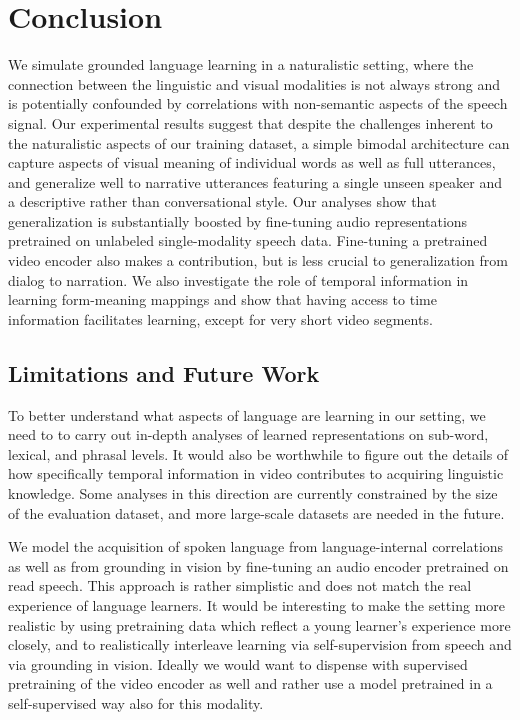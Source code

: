 \section{Conclusion}
\label{sec:conclusion}
We simulate grounded language learning in a naturalistic setting, where 
the connection between the linguistic and visual modalities is not always strong 
and is potentially confounded by correlations with non-semantic aspects of 
the speech signal. Our experimental results suggest that despite the 
challenges inherent to the naturalistic aspects of our training dataset, a 
simple bimodal architecture can capture aspects of visual meaning of individual 
words as well as full utterances, and generalize well to narrative utterances
featuring a single unseen speaker and a descriptive rather than
conversational style. Our analyses show that generalization is substantially
boosted by fine-tuning audio representations pretrained on unlabeled
single-modality speech data. Fine-tuning a pretrained video encoder
also makes a contribution, but is less crucial to generalization from
dialog to narration.
%
We also investigate the role of temporal information in learning form-meaning 
mappings and show that having access to 
time information facilitates learning, except for very short video segments. 

\subsection{Limitations and Future Work}
To better understand what aspects of language are learning in our
setting, we need to to carry out in-depth analyses of learned 
representations on sub-word, lexical, and phrasal levels. It would also be 
worthwhile to figure out the details of how specifically temporal information 
in video contributes to acquiring linguistic knowledge.  Some analyses in 
this direction are currently constrained by the size of the evaluation 
dataset, and more large-scale datasets are needed in the future.

We model the acquisition of spoken language from 
language-internal correlations as well as from grounding in vision 
by fine-tuning an audio encoder pretrained on read speech. This 
approach is rather simplistic and does not match the real experience of 
language learners. It would be interesting to make the setting
more realistic by using pretraining data which reflect a young
learner's experience more closely, and to realistically interleave learning via
self-supervision from speech and via grounding in vision.
Ideally we would want to dispense with supervised pretraining of 
the video encoder as well and rather use a model pretrained in a
self-supervised way also for this modality.

